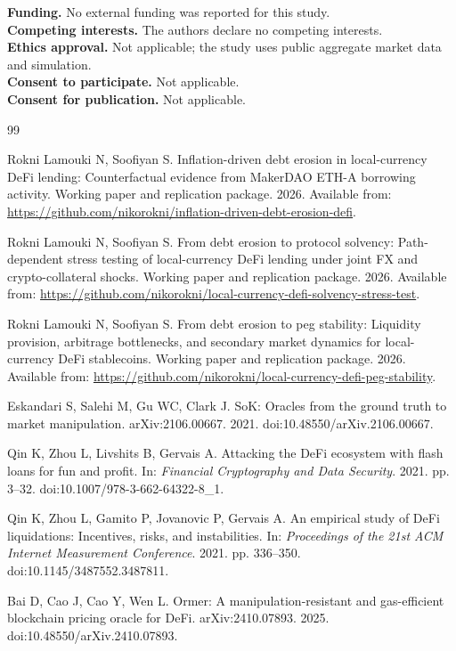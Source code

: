 \documentclass[sn-vancouver,Numbered]{sn-jnl}
\begin{document}
\textbf{Funding.} No external funding was reported for this study.\\
\textbf{Competing interests.} The authors declare no competing interests.\\
\textbf{Ethics approval.} Not applicable; the study uses public aggregate market data and simulation.\\
\textbf{Consent to participate.} Not applicable.\\
\textbf{Consent for publication.} Not applicable.

\begin{thebibliography}{99}

Rokni Lamouki N, Soofiyan S.
Inflation-driven debt erosion in local-currency DeFi lending: Counterfactual evidence from MakerDAO ETH-A borrowing activity.
Working paper and replication package. 2026.
Available from: \url{https://github.com/nikorokni/inflation-driven-debt-erosion-defi}.

Rokni Lamouki N, Soofiyan S.
From debt erosion to protocol solvency: Path-dependent stress testing of local-currency DeFi lending under joint FX and crypto-collateral shocks.
Working paper and replication package. 2026.
Available from: \url{https://github.com/nikorokni/local-currency-defi-solvency-stress-test}.

Rokni Lamouki N, Soofiyan S.
From debt erosion to peg stability: Liquidity provision, arbitrage bottlenecks, and secondary market dynamics for local-currency DeFi stablecoins.
Working paper and replication package. 2026.
Available from: \url{https://github.com/nikorokni/local-currency-defi-peg-stability}.

Eskandari S, Salehi M, Gu WC, Clark J.
SoK: Oracles from the ground truth to market manipulation.
arXiv:2106.00667. 2021.
doi:10.48550/arXiv.2106.00667.

Qin K, Zhou L, Livshits B, Gervais A.
Attacking the DeFi ecosystem with flash loans for fun and profit.
In: \textit{Financial Cryptography and Data Security}. 2021. pp. 3--32.
doi:10.1007/978-3-662-64322-8\_1.

Qin K, Zhou L, Gamito P, Jovanovic P, Gervais A.
An empirical study of DeFi liquidations: Incentives, risks, and instabilities.
In: \textit{Proceedings of the 21st ACM Internet Measurement Conference}. 2021. pp. 336--350.
doi:10.1145/3487552.3487811.

Bai D, Cao J, Cao Y, Wen L.
Ormer: A manipulation-resistant and gas-efficient blockchain pricing oracle for DeFi.
arXiv:2410.07893. 2025.
doi:10.48550/arXiv.2410.07893.


\end{thebibliography}
\end{document}
